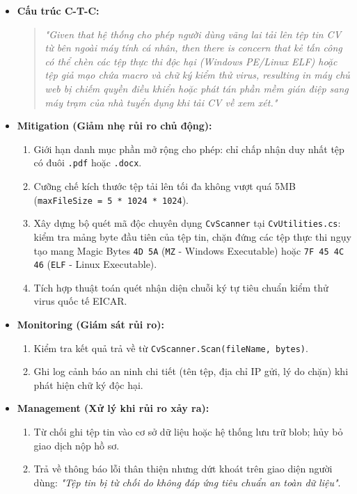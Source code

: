 \begin{itemize}
    \item \textbf{Cấu trúc C-T-C:} 
    \begin{quote}
    \textit{"Given that hệ thống cho phép người dùng vãng lai tải lên tệp tin CV từ bên ngoài máy tính cá nhân, then there is concern that kẻ tấn công có thể chèn các tệp thực thi độc hại (Windows PE/Linux ELF) hoặc tệp giả mạo chứa macro và chữ ký kiểm thử virus, resulting in máy chủ web bị chiếm quyền điều khiển hoặc phát tán phần mềm gián điệp sang máy trạm của nhà tuyển dụng khi tải CV về xem xét."}
    \end{quote}
    \item \textbf{Mitigation (Giảm nhẹ rủi ro chủ động):}
    \begin{enumerate}
        \item Giới hạn danh mục phần mở rộng cho phép: chỉ chấp nhận duy nhất tệp có đuôi \texttt{.pdf} hoặc \texttt{.docx}.
        \item Cưỡng chế kích thước tệp tải lên tối đa không vượt quá 5MB (\texttt{maxFileSize = 5 * 1024 * 1024}).
        \item Xây dựng bộ quét mã độc chuyên dụng \texttt{CvScanner} tại \texttt{CvUtilities.cs}: kiểm tra mảng byte đầu tiên của tệp tin, chặn đứng các tệp thực thi ngụy tạo mang Magic Bytes \texttt{4D 5A} (\texttt{MZ} - Windows Executable) hoặc \texttt{7F 45 4C 46} (\texttt{ELF} - Linux Executable).
        \item Tích hợp thuật toán quét nhận diện chuỗi ký tự tiêu chuẩn kiểm thử virus quốc tế EICAR.
    \end{enumerate}
    \item \textbf{Monitoring (Giám sát rủi ro):}
    \begin{enumerate}
        \item Kiểm tra kết quả trả về từ \texttt{CvScanner.Scan(fileName, bytes)}.
        \item Ghi log cảnh báo an ninh chi tiết (tên tệp, địa chỉ IP gửi, lý do chặn) khi phát hiện chữ ký độc hại.
    \end{enumerate}
    \item \textbf{Management (Xử lý khi rủi ro xảy ra):}
    \begin{enumerate}
        \item Từ chối ghi tệp tin vào cơ sở dữ liệu hoặc hệ thống lưu trữ blob; hủy bỏ giao dịch nộp hồ sơ.
        \item Trả về thông báo lỗi thân thiện nhưng dứt khoát trên giao diện người dùng: \textit{"Tệp tin bị từ chối do không đáp ứng tiêu chuẩn an toàn dữ liệu"}.
    \end{enumerate}
\end{itemize}


